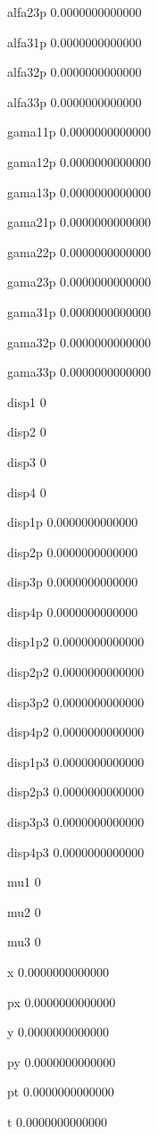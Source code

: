  alfa23p
   0.0000000000000 
  
 alfa31p
   0.0000000000000 
  
 alfa32p
   0.0000000000000 
  
 alfa33p
   0.0000000000000 
  
 gama11p
   0.0000000000000 
  
 gama12p
   0.0000000000000 
  
 gama13p
   0.0000000000000 
  
 gama21p
   0.0000000000000 
  
 gama22p
   0.0000000000000 
  
 gama23p
   0.0000000000000 
  
 gama31p
   0.0000000000000 
  
 gama32p
   0.0000000000000 
  
 gama33p
   0.0000000000000 
  
 disp1  
 0 
  
 disp2  
 0 
  
 disp3  
 0 
  
 disp4  
 0 
  
 disp1p 
   0.0000000000000 
  
 disp2p 
   0.0000000000000 
  
 disp3p 
   0.0000000000000 
  
 disp4p 
   0.0000000000000 
  
 disp1p2
   0.0000000000000 
  
 disp2p2
   0.0000000000000 
  
 disp3p2
   0.0000000000000 
  
 disp4p2
   0.0000000000000 
  
 disp1p3
   0.0000000000000 
  
 disp2p3
   0.0000000000000 
  
 disp3p3
   0.0000000000000 
  
 disp4p3
   0.0000000000000 
  
 mu1    
 0 
  
 mu2    
 0 
  
 mu3    
 0 
  
 x      
   0.0000000000000 
  
 px     
   0.0000000000000 
  
 y      
   0.0000000000000 
  
 py     
   0.0000000000000 
  
 pt     
   0.0000000000000 
  
 t      
   0.0000000000000 
  
